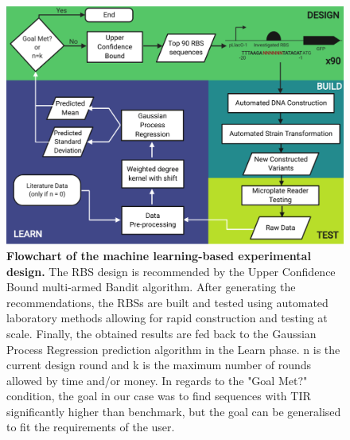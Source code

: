 \documentclass{scrartcl}[2013/05/29]%
\begin{document}
\begin{figure}[h]
    \centering
    \includegraphics[scale=0.7]{plots/Main_Paper/flowchart.pdf}
    \caption{\textbf{Flowchart of the machine learning-based experimental design.} The RBS design is recommended by the Upper Confidence Bound multi-armed Bandit algorithm. After generating the recommendations, the RBSs are built and tested using automated laboratory methods allowing for rapid construction and testing at scale. Finally, the obtained results are fed back to the Gaussian Process Regression prediction algorithm in the Learn phase. n is the current design round and k is the maximum number of rounds allowed by time and/or money. In regards to the "Goal Met?" condition, the goal in our case was to find sequences with TIR significantly higher than benchmark, but the goal can be generalised to fit the requirements of the user.}
    \label{fig: Flowchart}
\end{figure}
\end{document}
